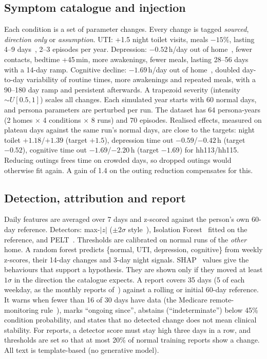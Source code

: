 \documentclass[10pt,a4paper]{article}
\begin{document}
\subsection{Symptom catalogue and injection}
Each condition is a set of parameter changes. Every change is tagged \emph{sourced}, \emph{direction only} or
\emph{assumption}. UTI: +1.5 night toilet visits, meals $-15\%$, lasting 4--9 days~\cite{hoffmann2020uti}, 2--3 episodes per
year. Depression: $-0.52$\,h/day out of home~\cite{petersen2015timeout}, fewer contacts, bedtime +45\,min, more awakenings,
fewer meals, lasting 28--56 days with a 14-day ramp. Cognitive decline: $-1.69$\,h/day out of
home~\cite{petersen2015timeout}, doubled day-to-day variability of routine times, more awakenings and repeated meals,
with a 90--180 day ramp and persistent afterwards. A trapezoid severity (intensity $\sim U[0.5,1]$) scales all changes. Each
simulated year starts with 60 normal days, and persona parameters are perturbed per run. The dataset has 64 persona-years
(2 homes $\times$ 4 conditions $\times$ 8 runs) and 70 episodes. Realised effects, measured on plateau days against the same run's normal days,
are close to the targets: night toilet $+1.18$/$+1.39$ (target $+1.5$), depression time out $-0.59$/$-0.42$\,h (target
$-0.52$), cognitive time out $-1.69$/$-2.20$\,h (target $-1.69$) for hh113/hh115. Reducing outings frees time on crowded
days, so dropped outings would otherwise fit again. A gain of 1.4 on the outing reduction compensates for this.

\subsection{Detection, attribution and report}
Daily features are averaged over 7 days and z-scored against the person's own 60-day reference. Detectors:
max-$|z|$ ($\pm2\sigma$ style~\cite{shahid2022anomalies}), Isolation Forest~\cite{liu2008iforest} fitted on the reference,
and PELT~\cite{killick2012pelt}. Thresholds are calibrated on normal runs of the \emph{other} home. A random forest
predicts \{normal, UTI, depression, cognitive\} from weekly z-scores, their 14-day changes and 3-day night signals.
SHAP~\cite{lundberg2017shap} values give the behaviours that support a hypothesis. They are shown only if they moved at least
$1\sigma$ in the direction the catalogue expects. A report covers 35 days (5 of each weekday, as the monthly reports
of~\cite{montreal2020report}) against a rolling or initial 60-day reference. It warns when fewer than 16 of 30 days have
data (the Medicare remote-monitoring rule~\cite{cms2026rpm}), marks ``ongoing since'', abstains (``indeterminate'')
below 45\% condition probability, and states that no detected change does not mean clinical stability. For reports,
a detector score must stay high three days in a row, and thresholds are set so that at most 20\% of normal training
reports show a change. All text is template-based (no generative model).
\end{document}
